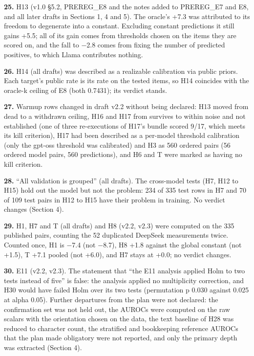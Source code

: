 \noindent\textbf{25.} H13 (v1.0 \S{}5.2, PREREG\_E8 and the notes added to PREREG\_E7 and E8, and all later drafts in Sections 1, 4 and 5). The oracle's +7.3 was attributed to its freedom to degenerate into a constant. Excluding constant predictions it still gains +5.5; all of its gain comes from thresholds chosen on the items they are scored on, and the fall to $-$2.8 comes from fixing the number of predicted positives, to which Llama contributes nothing.
\par

\noindent\textbf{26.} H14 (all drafts) was described as a realizable calibration via public priors. Each target's public rate is its rate on the tested items, so H14 coincides with the oracle-k ceiling of E8 (both 0.7431); its verdict stands.
\par

\noindent\textbf{27.} Warmup rows changed in draft v2.2 without being declared: H13 moved from dead to a withdrawn ceiling, H16 and H17 from survives to within noise and not established (one of three re-executions of H17's bundle scored 9/17, which meets its kill criterion), H17 had been described as a per-model threshold calibration (only the gpt-oss threshold was calibrated) and H3 as 560 ordered pairs (56 ordered model pairs, 560 predictions), and H6 and T were marked as having no kill criterion.
\par

\noindent\textbf{28.} ``All validation is grouped'' (all drafts). The cross-model tests (H7, H12 to H15) hold out the model but not the problem: 234 of 335 test rows in H7 and 70 of 109 test pairs in H12 to H15 have their problem in training. No verdict changes (Section 4).
\par

\noindent\textbf{29.} H1, H7 and T (all drafts) and H8 (v2.2, v2.3) were computed on the 335 published pairs, counting the 52 duplicated DeepSeek measurements twice. Counted once, H1 is $-$7.4 (not $-$8.7), H8 +1.8 against the global constant (not +1.5), T +7.1 pooled (not +6.0), and H7 stays at +0.0; no verdict changes.
\par

\noindent\textbf{30.} E11 (v2.2, v2.3). The statement that ``the E11 analysis applied Holm to two tests instead of five'' is false: the analysis applied no multiplicity correction, and H30 would have failed Holm over its two tests (permutation p 0.030 against 0.025 at alpha 0.05). Further departures from the plan were not declared: the confirmation set was not held out, the AUROCs were computed on the raw scalars with the orientation chosen on the data, the text baseline of H28 was reduced to character count, the stratified and bookkeeping reference AUROCs that the plan made obligatory were not reported, and only the primary depth was extracted (Section 4).
\par

